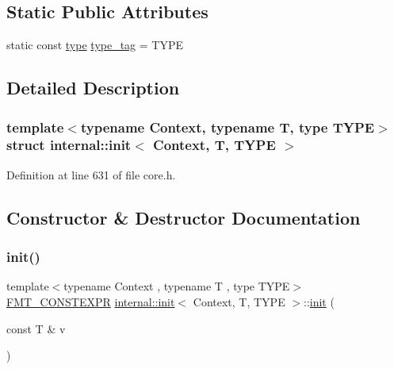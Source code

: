 \subsection*{Static Public Attributes}
\begin{DoxyCompactItemize}
\item 
static const \hyperlink{namespaceinternal_a8661864098ac0acff9a6dd7e66f59038}{type} \hyperlink{structinternal_1_1init_afddc941e9debc583ce5cb76627b5574d}{type\+\_\+tag} = T\+Y\+PE
\end{DoxyCompactItemize}


\subsection{Detailed Description}
\subsubsection*{template$<$typename Context, typename T, type T\+Y\+PE$>$\newline
struct internal\+::init$<$ Context, T, T\+Y\+P\+E $>$}



Definition at line 631 of file core.\+h.



\subsection{Constructor \& Destructor Documentation}
\mbox{\label{structinternal_1_1init_a87332b62836494da6623b1abf36fa2b9}} 
\subsubsection{\texorpdfstring{init()}{init()}}
{\footnotesize\ttfamily template$<$typename Context , typename T , type T\+Y\+PE$>$ \\
\hyperlink{core_8h_a69201cb276383873487bf68b4ef8b4cd}{F\+M\+T\+\_\+\+C\+O\+N\+S\+T\+E\+X\+PR} \hyperlink{structinternal_1_1init}{internal\+::init}$<$ Context, T, T\+Y\+PE $>$\+::\hyperlink{structinternal_1_1init}{init} (\begin{DoxyParamCaption}\item[{const T \&}]{v }\end{DoxyParamCaption})\hspace{0.3cm}{\ttfamily [inline]}}



